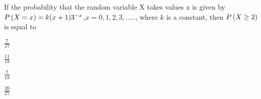     \item If the probability that the random variable X takes values x is given by $P\left(X=x\right)=k(x+1)3^{-x}$,$x=0,1,2,3,.....$, where $k$ is a constant, then $P\left(X\geq 2\right)$ is equal to
    \hfill{}\\
        \begin{enumerate}    
        \begin{multicols}{4}
                \item  $\frac{7}{27}$
                \item  $\frac{11}{18}$
                \item  $\frac{7}{18}$
                \item  $\frac{20}{27}$
        \end{multicols}
        \end{enumerate} 





